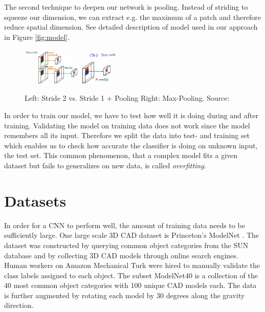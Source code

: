 \documentclass[10pt,twocolumn,letterpaper]{article}
\begin{document}
The second technique to deepen our network is pooling. Instead of striding to squeeze our dimension, we can extract e.g. the maximum of a patch and therefore reduce spatial dimension. 
See detailed description of model used in our approach in Figure \ref{fig:model}.

\begin{figure}[h]
	\label{fig:pooling}
	\includegraphics[width=0.25\textwidth]{figures/con_max}
	\includegraphics[width=0.16\textwidth]{figures/max}
	\caption{Left: Stride 2 vs. Stride 1 + Pooling \quad Right: Max-Pooling. Source: \cite{udacity}}
\end{figure}

In order to train our model, we have to test how well it is doing during and after training. 
Validating the model on training data does not work since the model remembers all its input. Therefore we split the data into test- and training set which enables us to check how accurate the classifier is doing on unknown input, the test set. This common phenomenon, that a complex model fits a given dataset but fails to generalizes on new data, is called \textit{overfitting}.

\section{Datasets}
\label{data:modelnet}

In order for a CNN to perform well, the amount of training data needs to be sufficiently large. One large scale 3D CAD dataset is Princeton's 
ModelNet \cite{shape}. The dataset was constructed by querying common object categories from the SUN database \cite{sun} and 
by collecting 3D CAD models through online search engines. Human workers on Amazon Mechanical Turk were hired 
to manually validate the class labels assigned to each object.
The subset ModelNet40 is a collection of the 40 most common object categories with 100 unique CAD models each. The data is further augmented
by rotating each model by 30 degrees along the gravity direction. 
\end{document}
